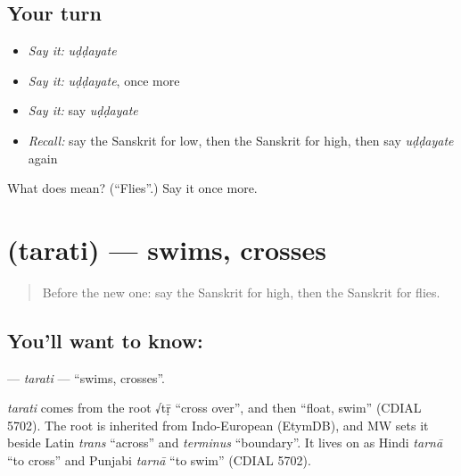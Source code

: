 \subsection*{Your turn}
\begin{itemize}
\raggedright
  \item \emph{Say it:} \emph{uḍḍayate}
  \item \emph{Say it:} \emph{uḍḍayate}, once more
  \item \emph{Say it:} say \emph{uḍḍayate}
  \item \emph{Recall:} say the Sanskrit for low, then the Sanskrit for high, then say \emph{uḍḍayate} again
\end{itemize}

\begin{tcolorbox}[breakable,colback=teal!4,colframe=teal!35!black,title={Before you move on}]
What does  mean? (\textquotedblleft{}Flies\textquotedblright{}.) Say it once more.
\end{tcolorbox}
\section[\texorpdfstring{\sk{तरति} (tarati)}{तरति (tarati)}]{ (tarati) — swims, crosses}

\label{lesson:SA-C133-tarati}



\begin{quote}
Before the new one: say the Sanskrit for high, then the Sanskrit for flies.
\end{quote}

\subsection*{You'll want to know: }
\textbf{} — \emph{tarati} — \textquotedblleft{}swims, crosses\textquotedblright{}.

\begin{cousinweb}
\emph{tarati} comes from the root √tṝ \textquotedblleft{}cross over\textquotedblright{}, and then \textquotedblleft{}float, swim\textquotedblright{} (CDIAL 5702). The root is inherited from Indo-European (EtymDB), and MW sets it beside Latin \emph{trans} \textquotedblleft{}across\textquotedblright{} and \emph{terminus} \textquotedblleft{}boundary\textquotedblright{}. It lives on as Hindi \emph{tarnā} \textquotedblleft{}to cross\textquotedblright{} and Punjabi \emph{tarnā} \textquotedblleft{}to swim\textquotedblright{} (CDIAL 5702).
\end{cousinweb}

